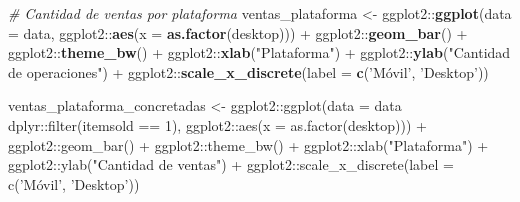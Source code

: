 \documentclass[
  12pt]{article}
\newenvironment{Shaded}{}{}
\newcommand{\CommentTok}[1]{\textcolor[rgb]{0.38,0.63,0.69}{\textit{#1}}}
\newcommand{\DataTypeTok}[1]{\textcolor[rgb]{0.56,0.13,0.00}{#1}}
\newcommand{\KeywordTok}[1]{\textcolor[rgb]{0.00,0.44,0.13}{\textbf{#1}}}
\newcommand{\NormalTok}[1]{#1}
\newcommand{\OperatorTok}[1]{\textcolor[rgb]{0.40,0.40,0.40}{#1}}
\newcommand{\StringTok}[1]{\textcolor[rgb]{0.25,0.44,0.63}{#1}}
\begin{document}
\begin{Shaded}
\begin{Highlighting}[]
{{\CommentTok{# Cantidad de ventas por plataforma}
\NormalTok{ventas_plataforma <-}\StringTok{ }\NormalTok{ggplot2}\OperatorTok{::}\KeywordTok{ggplot}\NormalTok{(}\DataTypeTok{data =}\NormalTok{ data, ggplot2}\OperatorTok{::}\KeywordTok{aes}\NormalTok{(}\DataTypeTok{x =} \KeywordTok{as.factor}\NormalTok{(desktop))) }\OperatorTok{+}
\StringTok{  }\NormalTok{ggplot2}\OperatorTok{::}\KeywordTok{geom_bar}\NormalTok{() }\OperatorTok{+}
\StringTok{  }\NormalTok{ggplot2}\OperatorTok{::}\KeywordTok{theme_bw}\NormalTok{() }\OperatorTok{+}
\StringTok{  }\NormalTok{ggplot2}\OperatorTok{::}\KeywordTok{xlab}\NormalTok{(}\StringTok{"Plataforma"}\NormalTok{) }\OperatorTok{+}\StringTok{ }\NormalTok{ggplot2}\OperatorTok{::}\KeywordTok{ylab}\NormalTok{(}\StringTok{"Cantidad de operaciones"}\NormalTok{) }\OperatorTok{+}
\StringTok{  }\NormalTok{ggplot2}\OperatorTok{::}\KeywordTok{scale_x_discrete}\NormalTok{(}\DataTypeTok{label =} \KeywordTok{c}\NormalTok{(}\StringTok{'Móvil', '}\NormalTok{Desktop}\StringTok{'))}
\StringTok{ventas_plataforma_concretadas <- ggplot2::ggplot(data = data %>%}
\StringTok{                                                   dplyr::filter(itemsold == 1),}
\StringTok{                                                 ggplot2::aes(x = as.factor(desktop))) +}
\StringTok{  ggplot2::geom_bar() +}
\StringTok{  ggplot2::theme_bw() +}
\StringTok{  ggplot2::xlab("Plataforma") + ggplot2::ylab("Cantidad de ventas") +}
\StringTok{  ggplot2::scale_x_discrete(label = c('}\NormalTok{Móvil', }\StringTok{'Desktop'}\NormalTok{))}


}}}
\end{Highlighting}
\end{Shaded}
\end{document}
